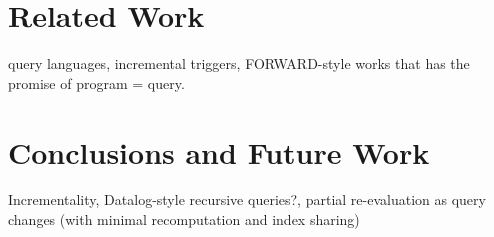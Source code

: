 \documentclass[runningheads]{llncs}
\begin{document}
\section{Related Work}\label{sec:related_work}
query languages, incremental triggers, FORWARD-style works that has the promise
of program = query.


\section{Conclusions and Future Work}\label{sec:conclusions}
Incrementality, Datalog-style recursive queries?, partial re-evaluation as
query changes (with minimal recomputation and index sharing)
%
%



\end{document}
